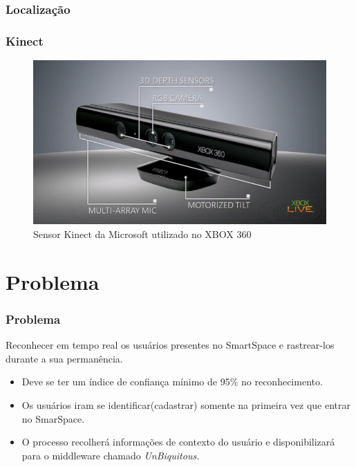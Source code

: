 \documentclass{beamer}
\begin{document}
\begin{frame}
    \frametitle{Localização}
   
\end{frame}


\begin{frame}
    \frametitle{Kinect}
    
    \begin{figure}[h]
    \centering \includegraphics[scale=0.4]{figuras/kinect_info.jpg}
        \caption{Sensor Kinect da Microsoft utilizado no XBOX 360}
        \label{reconhecimento_facial}
    \end{figure}
\end{frame}

\section{Problema}
\begin{frame}
    \frametitle{Problema}
    Reconhecer em tempo real os usuários presentes no SmartSpace e rastrear-los durante a sua permanência. \\
	\begin{itemize}
      		\pause \item Deve se ter um índice de confiança mínimo de 95\% no reconhecimento. \\
		\pause \item Os usuários iram se identificar(cadastrar) somente na primeira vez que entrar no SmarSpace. \\
    		\pause \item O processo recolherá informações de contexto do usuário e disponibilizará para o middleware chamado \it{UnBiquitous}.
	\end{itemize}
\end{frame}
\end{document}
